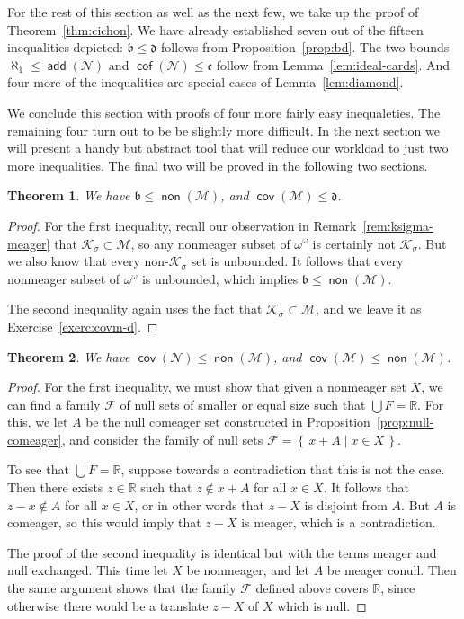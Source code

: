\documentclass[11pt,oneside]{amsbook}
\newcommand{\set}[1]{\left\{\,#1\,\right\}}
\newcommand{\R}{\mathbb R}
\newcommand{\Null}{\mathcal N}
\newcommand{\Meager}{\mathcal M}
\newcommand{\Ksigma}{\mathcal K_\sigma}
\DeclareMathOperator{\add}{\mathsf{add}}
\DeclareMathOperator{\non}{\mathsf{non}}
\DeclareMathOperator{\cov}{\mathsf{cov}}
\DeclareMathOperator{\cof}{\mathsf{cof}}
\theoremstyle{definition}
\theoremstyle{plain}
\newtheorem{theorem}{Theorem}[section]
\theoremstyle{definition}
\theoremstyle{remark}
\numberwithin{equation}{section}
\numberwithin{figure}{section}
\begin{document}
For the rest of this section as well as the next few, we take up the proof of Theorem~\ref{thm:cichon}. We have already established seven out of the fifteen inequalities depicted: $\mathfrak b\leq\mathfrak d$ follows from Proposition~\ref{prop:bd}. The two bounds $\aleph_1\leq\add(\Null)$ and $\cof(\Null)\leq\mathfrak c$ follow from Lemma~\ref{lem:ideal-cards}. And four more of the inequalities are special cases of Lemma~\ref{lem:diamond}.

We conclude this section with proofs of four more fairly easy inequaleties. The remaining four turn out to be be slightly more difficult. In the next section we will present a handy but abstract tool that will reduce our workload to just two more inequalities. The final two will be proved in the following two sections.

\begin{theorem}
  \label{thm:b-nonm}
  We have $\mathfrak b\leq\non(\Meager)$, and $\cov(\Meager)\leq\mathfrak d$.
\end{theorem}

\begin{proof}
  For the first inequality, recall our observation in Remark~\ref{rem:ksigma-meager} that $\Ksigma\subset\Meager$, so any nonmeager subset of $\omega^\omega$ is certainly not $\Ksigma$. But we also know that every non-$\Ksigma$ set is unbounded. It follows that every nonmeager subset of $\omega^\omega$ is unbounded, which implies $\mathfrak b\leq\non(\Meager)$.

  The second inequality again uses the fact that $\Ksigma\subset\Meager$, and we leave it as Exercise~\ref{exerc:covm-d}.
\end{proof}

\begin{theorem}
  \label{thm:covn-nonm}
  We have $\cov(\Null)\leq\non(\Meager)$, and $\cov(\Meager)\leq\non(\Meager)$.
\end{theorem}

\begin{proof}
  For the first inequality, we must show that given a nonmeager set $X$, we can find a family $\mathcal F$ of null sets of smaller or equal size such that $\bigcup F=\R$. For this, we let $A$ be the null comeager set constructed in Proposition~\ref{prop:null-comeager}, and consider the family of null sets $\mathcal F=\set{x+A\mid x\in X}$.

  To see that $\bigcup F=\R$, suppose towards a contradiction that this is not the case. Then there exists $z\in\R$ such that $z\notin x+A$ for all $x\in X$. It follows that $z-x\notin A$ for all $x\in X$, or in other words that $z-X$ is disjoint from $A$. But $A$ is comeager, so this would imply that $z-X$ is meager, which is a contradiction.

  The proof of the second inequality is identical but with the terms meager and null exchanged. This time let $X$ be nonmeager, and let $A$ be meager conull. Then the same argument shows that the family $\mathcal F$ defined above covers $\R$, since otherwise there would be a translate $z-X$ of $X$ which is null.
\end{proof}
\end{document}
